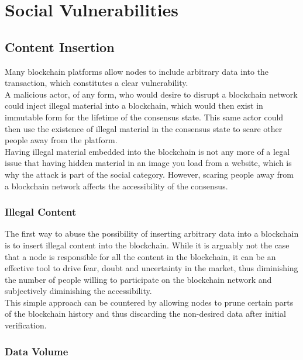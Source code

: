 \documentclass[11pt,a4paper]{article}
\begin{document}
\section{Social Vulnerabilities}

\subsection{Content Insertion}

Many blockchain platforms allow nodes to include arbitrary data into the transaction, which constitutes a clear vulnerability.\\

A malicious actor, of any form, who would desire to disrupt a blockchain network could inject illegal material into a blockchain, which would then exist in immutable form for the lifetime of the consensus state. This same actor could then use the existence of illegal material in the consensus state to scare other people away from the platform.\\

Having illegal material embedded into the blockchain is not any more of a legal issue that having hidden material in an image you load from a website, which is why the attack is part of the social category. However, scaring people away from a blockchain network affects the accessibility of the consensus.\\

\subsubsection{Illegal Content}

The first way to abuse the possibility of inserting arbitrary data into a blockchain is to insert illegal content into the blockchain. While it is arguably not the case that a node is responsible for all the content in the blockchain, it can be an effective tool to drive fear, doubt and uncertainty in the market, thus diminishing the number of people willing to participate on the blockchain network and subjectively diminishing the accessibility.\\

This simple approach can be countered by allowing nodes to prune certain parts of the blockchain history and thus discarding the non-desired data after initial verification.\\

\subsubsection{Data Volume}
\end{document}

